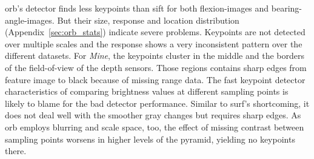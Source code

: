 \begin{table}[b!]
    {\renewcommand{\arraystretch}{1.2}%
    \setlength{\tabcolsep}{0.7em}%
    \footnotesize

    }
    \caption[Keypoint and matching results for \texttt{\acrshort{orb}/raw/default}]{\emph{Keypoint and matching results for \texttt{\acrshort{orb}/raw/default}.} The high number of false negatives and the low Youden index are an indicator for problems of the algorithm. The amount of additional keypoints for \glspl{flexion-image} is lower than for \acrshort{sift}.}
\end{table}
\acrshort{orb}'s detector finds less keypoints than \acrshort{sift} for both \glspl{flexion-image} and \glspl{bearing-angle-image}.
But their size, response and location distribution (Appendix~\ref{sec:orb_stats}) indicate severe problems.
Keypoints are not detected over multiple scales and the response shows a very inconsistent pattern over the different datasets.
For \emph{Mine}, the keypoints cluster in the middle and the borders of the field-of-view of the depth sensors.
Those regions contains sharp edges from feature image to black because of missing range data.
The \acrshort{fast} keypoint detector characteristics of comparing brightness values at different sampling points is likely to blame for the bad detector performance.
Similar to \acrshort{surf}'s shortcoming, it does not deal well with the smoother gray changes but requires sharp edges.
As \acrshort{orb} employs blurring and scale space, too, the effect of missing contrast between sampling points worsens in higher levels of the pyramid, yielding no keypoints there.
